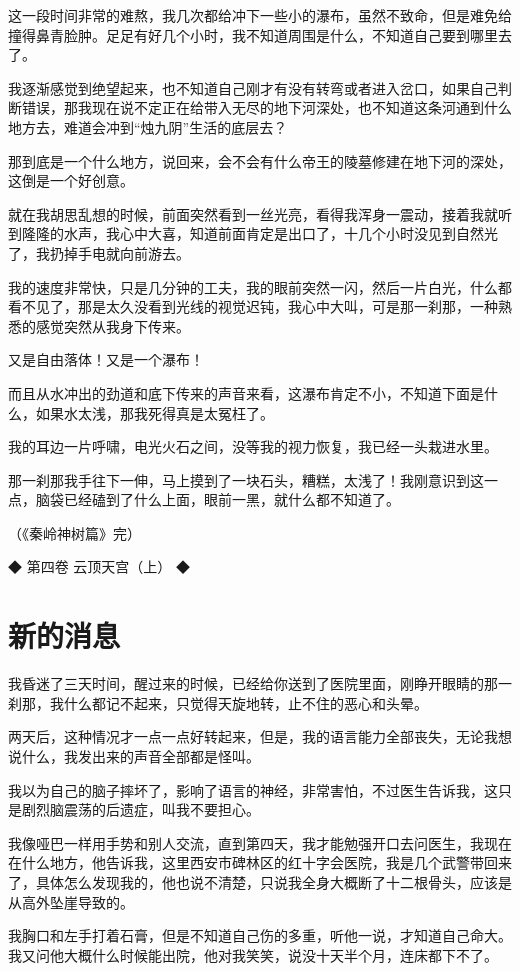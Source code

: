 这一段时间非常的难熬，我几次都给冲下一些小的瀑布，虽然不致命，但是难免给撞得鼻青脸肿。足足有好几个小时，我不知道周围是什么，不知道自己要到哪里去了。

我逐渐感觉到绝望起来，也不知道自己刚才有没有转弯或者进入岔口，如果自己判断错误，那我现在说不定正在给带入无尽的地下河深处，也不知道这条河通到什么地方去，难道会冲到“烛九阴”生活的底层去？

那到底是一个什么地方，说回来，会不会有什么帝王的陵墓修建在地下河的深处，这倒是一个好创意。

就在我胡思乱想的时候，前面突然看到一丝光亮，看得我浑身一震动，接着我就听到隆隆的水声，我心中大喜，知道前面肯定是出口了，十几个小时没见到自然光了，我扔掉手电就向前游去。

我的速度非常快，只是几分钟的工夫，我的眼前突然一闪，然后一片白光，什么都看不见了，那是太久没看到光线的视觉迟钝，我心中大叫，可是那一刹那，一种熟悉的感觉突然从我身下传来。

又是自由落体！又是一个瀑布！

而且从水冲出的劲道和底下传来的声音来看，这瀑布肯定不小，不知道下面是什么，如果水太浅，那我死得真是太冤枉了。

我的耳边一片呼啸，电光火石之间，没等我的视力恢复，我已经一头栽进水里。

那一刹那我手往下一伸，马上摸到了一块石头，糟糕，太浅了！我刚意识到这一点，脑袋已经磕到了什么上面，眼前一黑，就什么都不知道了。

（《秦岭神树篇》完）

◆ 第四卷 云顶天宫（上） ◆

\chapter{新的消息}

我昏迷了三天时间，醒过来的时候，已经给你送到了医院里面，刚睁开眼睛的那一刹那，我什么都记不起来，只觉得天旋地转，止不住的恶心和头晕。

两天后，这种情况才一点一点好转起来，但是，我的语言能力全部丧失，无论我想说什么，我发出来的声音全部都是怪叫。

我以为自己的脑子摔坏了，影响了语言的神经，非常害怕，不过医生告诉我，这只是剧烈脑震荡的后遗症，叫我不要担心。

我像哑巴一样用手势和别人交流，直到第四天，我才能勉强开口去问医生，我现在在什么地方，他告诉我，这里西安市碑林区的红十字会医院，我是几个武警带回来了，具体怎么发现我的，他也说不清楚，只说我全身大概断了十二根骨头，应该是从高外坠崖导致的。

我胸口和左手打着石膏，但是不知道自己伤的多重，听他一说，才知道自己命大。我又问他大概什么时候能出院，他对我笑笑，说没十天半个月，连床都下不了。

